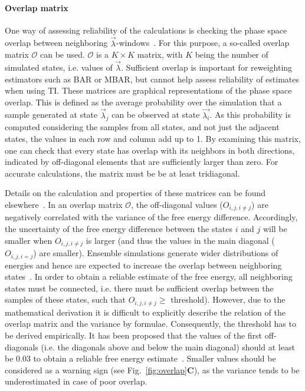 \documentclass[9pt,bestpractices]{livecoms}
\begin{document}
\paragraph{Overlap matrix}
One way of assessing reliability of the calculations is checking the phase space overlap between neighboring $\vec{\lambda}$-windows~\cite{wu2005phasespace, wu2005phasespacea}. For this purpose, a so-called overlap matrix $\mathcal{O}$ can be used. $\mathcal{O}$ is a $K\times K$ matrix, with $K$ being the number of simulated states, i.e. values of $\vec{\lambda}$. Sufficient overlap is important for reweighting estimators such as BAR or MBAR, but cannot help assess reliability of estimates when using TI. 
These matrices are graphical representations of the phase space overlap. This is defined as the average probability over the simulation that a sample generated at state $\vec{\lambda}_{j}$ can be observed at state $\vec{\lambda_{i}}$. As this probability is computed considering the samples from all states, and not just the adjacent states, the values in each row and column add up to 1. By examining this matrix, one can check that every state has overlap with its neighbors in both directions, indicated by off-diagonal elements that are sufficiently larger than zero. For accurate calculations, the matrix must be be at least tridiagonal.

Details on the calculation and properties of these matrices can be found elsewhere~\cite{klimovich2015guidelines}.
In an overlap matrix $\mathcal{O}$, the off-diagonal values (${O}_{i,j,i\ne j}$) are negatively correlated with the variance of the free energy difference. Accordingly, the uncertainty of the free energy difference between the states $i$ and $j$ will be smaller when ${O}_{i,j,i\ne j}$ is larger (and thus the values in the main diagonal (${O}_{i,j,i=j}$) are smaller). 
Ensemble simulations generate wider distributions of energies and hence are expected to increase the overlap between neighboring states~\cite{wade2022}.
In order to obtain a reliable estimate of the free energy, all neighboring states must be connected, i.e. there must be sufficient overlap between the samples of these states, such that ${O}_{i,j,i\ne j}\ge$ threshold).
However, due to the mathematical derivation it is difficult to explicitly describe the relation of the overlap matrix and the variance by formulae. Consequently, the threshold has to be derived empirically. It has been proposed that the values of the first off-diagonals (i.e. the diagonals above and below the main diagonal) should at least be 0.03 to obtain a reliable free energy estimate~\cite{klimovich2015guidelines}. Smaller values should be considered as a warning sign (see Fig.~\ref{fig:overlap}\textbf{C}), as the variance tends to be underestimated in case of poor overlap.
\end{document}
